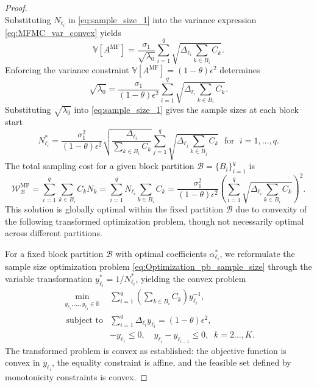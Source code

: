 \begin{proof}
\begin{equation}
\end{equation}
%
Substituting $N_{\ell_i}$ in \eqref{eq:sample_size_1} into the variance expression \eqref{eq:MFMC_var_convex} yields
%
\begin{equation*} \label{eq:MFMC_variance2}
    \mathbb{V}\left[A^{\text{MF}}\right] = \frac{\sigma_1}{\sqrt{\lambda_0}}\sum_{i=1}^q\sqrt{\Delta_{\ell_i}\sum_{k\in B_i} C_k}.
\end{equation*}
%
Enforcing the variance constraint $\mathbb{V}[A^{\text{MF}}] = (1-\theta)\epsilon^2$ determines 
%
\[
\sqrt{\lambda_0}=\frac{\sigma_1}{(1-\theta)\epsilon^2} \sum_{i=1}^{q} \sqrt{\Delta_{\ell_i}\sum_{k\in B_i} C_{k}}.
\]
%
Substituting $\sqrt{\lambda_0}$ into \eqref{eq:sample_size_1} gives the sample sizes at each block start
%
\[
N_{\ell_i}^* = \frac{\sigma_1^2}{(1-\theta)\epsilon^2}\sqrt{\frac{\Delta_{\ell_i}}{\sum_{k\in B_i} C_{k}}}  \sum_{j=1}^{q} \sqrt{\Delta_{\ell_j}\sum_{k\in B_j} C_{k}} \;\text{ for }\; i=1,\ldots,q.
\]
%
The total sampling cost for a given block partition $\mathscr{B} = \{B_i\}_{i=1}^q$ is
%
\begin{equation*}
\mathcal{W}_{\mathscr{B}}^{\text{MF}} = \sum_{i=1}^q \sum_{k\in B_i} C_k N_k = \sum_{i=1}^q N_{\ell_i}\sum_{k\in B_i} C_k =\frac{\sigma_1^2}{(1-\theta)\epsilon^2}\left(\sum_{i=1}^{q} \sqrt{\Delta_{\ell_i}\sum_{k\in B_i} C_{k}}\right)^2.
\end{equation*}
%
This solution is globally optimal within the fixed partition $\mathscr{B}$ due to convexity of the following transformed optimization problem, though not necessarily optimal across different  partitions.

\medskip
{}

For a fixed block partition $\mathscr{B}$ with optimal coefficients $\alpha_{\ell_i}^*$, we reformulate the sample size optimization problem \eqref{eq:Optimization_pb_sample_size} through the variable transformation $y_{\ell_i}^* = 1/N_{\ell_i}^*$, yielding the convex problem
%
\begin{equation}\label{eq:Optimization_pb_sample_size3}
    \begin{array}{ll}
    \min \limits_{\begin{array}{c}\scriptstyle y_{\ell_1},\ldots, y_{\ell_q}\in \mathbb{R}
\end{array}} &\displaystyle \sum_{i=1}^q \left(\sum_{k\in B_i}C_{k}\right)y_{\ell_i}^{-1},\\
       \;\,\text{subject to} &\displaystyle \sum_{i=1}^q \Delta_{\ell_i} y_{\ell_i}= (1-\theta)\epsilon^2,\\[2pt]
       &\displaystyle -y_{\ell_1}\le 0,\quad \displaystyle y_{\ell_i}-y_{\ell_{i-1}}\le 0, \;\; k=2\ldots,K.
    \end{array}
\end{equation}
%
The transformed problem is convex as established: the objective function is convex in $y_{\ell_i}$, the equality constraint is affine, and the feasible set defined by monotonicity constraints is convex.  


\end{proof}
